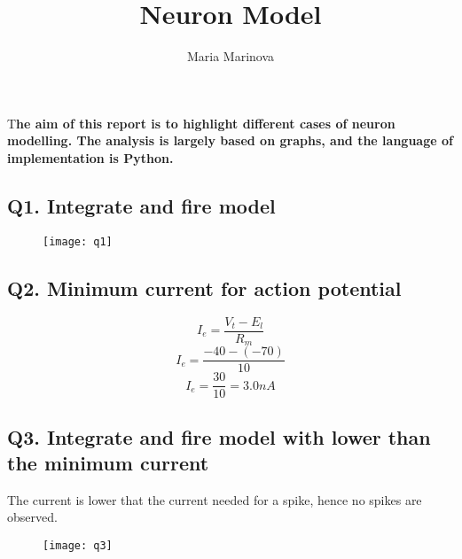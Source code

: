 \documentclass[DIV=calc, paper=a4, fontsize=11pt, twocolumn]{article}	 %
\title{Neuron Model} %
\author{Maria Marinova} %
\date{\vspace{-30pt}} %
\newcommand{\initial}[1]{ %
	\lettrine[lines=3,lhang=0.3,nindent=0em]{
		\color{Teal}
		{\textsf{#1}}}{}}
\begin{document}
	
	\maketitle %
	
	\thispagestyle{fancy} %
	
	
	\initial{T}\textbf{he aim of this report is to highlight different cases of neuron modelling. The analysis is largely based on graphs, and the language of implementation is Python.}
	
	
	\subsection*{Q1. Integrate and fire model}
		\begin{figure}[H]
			\texttt{[image: q1]}
		\end{figure}
	\subsection*{Q2. Minimum current for action potential}
		\begin{equation}
			I_e = \dfrac{V_t - E_l}{R_m}
		\end{equation}
		\begin{equation}
			I_e = \dfrac{-40 - (-70)}{10}
		\end{equation}
		\begin{equation}
			I_e = \dfrac{30}{10} = 3.0 nA
		\end{equation}
	\subsection*{Q3. Integrate and fire model with lower than the minimum current}
	The current is lower that the current needed for a spike, hence no spikes are observed.
		\begin{figure}[H]
			\texttt{[image: q3]}
		\end{figure}
\end{document}
